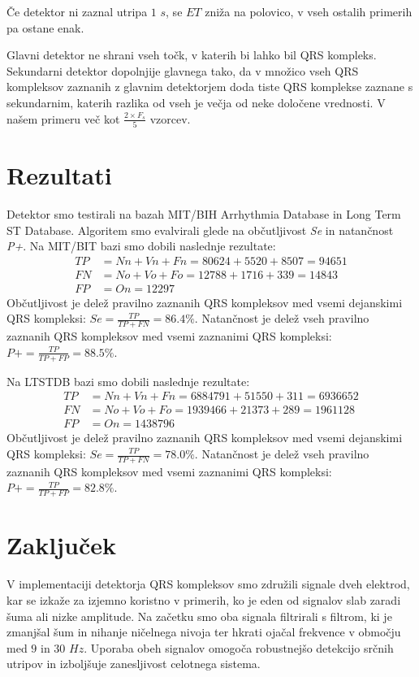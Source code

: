 \documentclass{article}
\begin{document}
    Če detektor ni zaznal utripa $1$ $s$, se $ET$ zniža na polovico, v vseh ostalih primerih pa ostane enak. 

    Glavni detektor ne shrani vseh točk, v katerih bi lahko bil QRS kompleks. Sekundarni detektor dopolnjije glavnega tako, 
    da v množico vseh QRS kompleksov zaznanih z glavnim detektorjem doda tiste QRS komplekse zaznane s sekundarnim, katerih razlika 
    od vseh je večja od neke določene vrednosti. V našem primeru več kot $\frac{2 \times F_s}{5}$ vzorcev.

    \section{Rezultati}
    Detektor smo testirali na bazah MIT/BIH Arrhythmia Database in Long Term ST Database. Algoritem smo evalvirali glede na občutljivost \emph{Se} in 
    natančnost \emph{P+}. Na MIT/BIT bazi smo dobili naslednje rezultate:
    \begin{align*}
        TP &= Nn + Vn + Fn = 80624 + 5520 + 8507 = 94651 \\
        FN &= No + Vo + Fo = 12788 + 1716 + 339 = 14843 \\
        FP &= On = 12297
    \end{align*}
    Občutljivost je delež pravilno zaznanih QRS kompleksov med vsemi dejanskimi QRS kompleksi: $Se = \frac{TP}{TP + FN} = 86.4\%$.
    Natančnost je delež vseh pravilno zaznanih QRS kompleksov med vsemi zaznanimi QRS kompleksi: $P+ = \frac{TP}{TP + FP} = 88.5\%$.

    Na LTSTDB bazi smo dobili naslednje rezultate:
    \begin{align*}
        TP &= Nn + Vn + Fn = 6884791 + 51550 + 311 = 6936652 \\
        FN &= No + Vo + Fo = 1939466 + 21373 + 289 = 1961128 \\
        FP &= On = 1438796
    \end{align*}
    Občutljivost je delež pravilno zaznanih QRS kompleksov med vsemi dejanskimi QRS kompleksi: $Se = \frac{TP}{TP + FN} = 78.0\%$.
    Natančnost je delež vseh pravilno zaznanih QRS kompleksov med vsemi zaznanimi QRS kompleksi: $P+ = \frac{TP}{TP + FP} = 82.8\%$.



    \section{Zaključek}
    V implementaciji detektorja QRS kompleksov smo združili signale dveh elektrod, kar se izkaže za izjemno koristno v primerih, ko 
    je eden od signalov slab zaradi šuma ali nizke amplitude. Na začetku smo oba signala filtrirali s filtrom, ki je zmanjšal šum in 
    nihanje ničelnega nivoja ter hkrati ojačal frekvence v območju med $9$ in $30$ $Hz$. Uporaba obeh signalov omogoča robustnejšo 
    detekcijo srčnih utripov in izboljšuje zanesljivost celotnega sistema.
\end{document}
